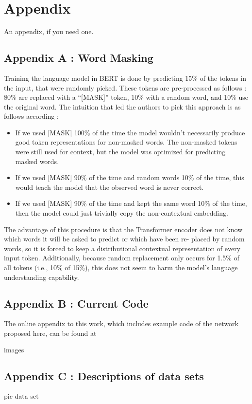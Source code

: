 \chapter{Appendix}\label{ch:data}
An appendix, if you need one.

\section{Appendix A : Word Masking}

Training the language model in BERT is done by predicting 15{\%} of the tokens in the input, that were randomly picked. These tokens are pre-processed as follows : 80{\%} are replaced with a “[MASK]” token, 10{\%} with a random word, and 10{\%} use the original word. The intuition that led the authors to pick this approach is as follows according \citeauthor{Devlin2018} :
\begin{itemize}
 
\item If we used [MASK] 100{\%} of the time the model wouldn’t necessarily produce good token representations for non-masked words. The non-masked tokens were still used for context, but the model was optimized for predicting masked words.
\item If we used [MASK] 90{\%} of the time and random words 10{\%} of the time, this would teach the model that the observed word is never correct.
\item If we used [MASK] 90{\%} of the time and kept the same word 10{\%} of the time, then the model could just trivially copy the non-contextual embedding.
\end{itemize}

The advantage of this procedure is that the
Transformer encoder does not know which words it will be asked to predict or which have been re- placed by random words, so it is forced to keep a distributional contextual representation of every input token. Additionally, because random replacement only occurs for 1.5{\%} of all tokens (i.e., 10{\%} of 15{\%}), this does not seem to harm the model’s language understanding capability.


\section{Appendix B : Current Code}
The online appendix to this work, which includes example code of the network
proposed here, can be found at 

images

\section{Appendix C : Descriptions of data sets}

pic data set